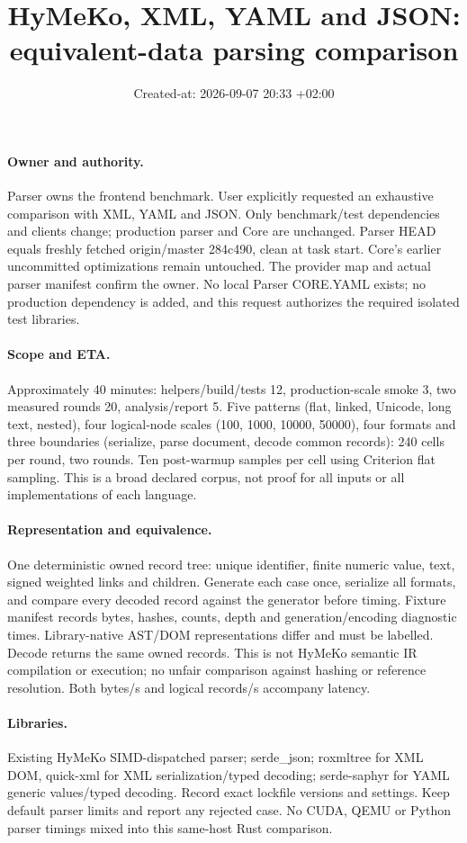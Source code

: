 \documentclass[11pt,a4paper]{article}
\title{HyMeKo, XML, YAML and JSON: equivalent-data parsing comparison}
\date{Created-at: 2026-09-07 20:33 +02:00}
\begin{document}
\maketitle
\paragraph{Owner and authority.} Parser owns the frontend benchmark. User explicitly
requested an exhaustive comparison with XML, YAML and JSON. Only benchmark/test
dependencies and clients change; production parser and Core are unchanged. Parser
HEAD equals freshly fetched origin/master 284c490, clean at task start. Core's
earlier uncommitted optimizations remain untouched. The provider map and actual
parser manifest confirm the owner. No local Parser CORE.YAML exists; no production
dependency is added, and this request authorizes the required isolated test libraries.
\paragraph{Scope and ETA.} Approximately 40 minutes: helpers/build/tests 12,
production-scale smoke 3, two measured rounds 20, analysis/report 5. Five patterns
(flat, linked, Unicode, long text, nested), four logical-node scales
(100, 1000, 10000, 50000), four formats and three boundaries (serialize, parse
document, decode common records): 240 cells per round, two rounds. Ten post-warmup
samples per cell using Criterion flat sampling. This is a broad declared corpus,
not proof for all inputs or all implementations of each language.
\paragraph{Representation and equivalence.} One deterministic owned record tree:
unique identifier, finite numeric value, text, signed weighted links and children.
Generate each case once, serialize all formats, and compare every decoded record
against the generator before timing. Fixture manifest records bytes, hashes, counts,
depth and generation/encoding diagnostic times. Library-native AST/DOM representations
differ and must be labelled. Decode returns the same owned records. This is not
HyMeKo semantic IR compilation or execution; no unfair comparison against hashing
or reference resolution. Both bytes/s and logical records/s accompany latency.
\paragraph{Libraries.} Existing HyMeKo SIMD-dispatched parser; serde\_json;
roxmltree for XML DOM, quick-xml for XML serialization/typed decoding;
serde-saphyr for YAML generic values/typed decoding. Record exact lockfile versions
and settings. Keep default parser limits and report any rejected case. No CUDA,
QEMU or Python parser timings mixed into this same-host Rust comparison.
\end{document}
